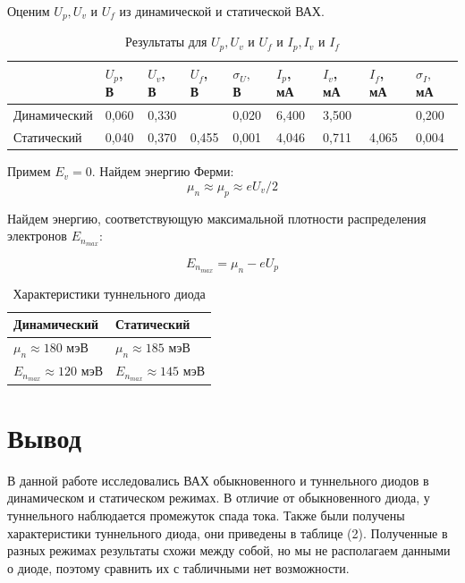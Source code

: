 \documentclass[a4paper,12pt]{article} %
\begin{document}
Оценим $U_p, U_v$ и $U_f$ из динамической и статической ВАХ.

\begin{table}[h!]
\begin{tabular}{|l|l|l|l|l|l|l|l|l|}
\hline
             & $U_p$, В & $U_v$, В & $U_f$, В & $\sigma_U, $ В & $I_p$, мА & $I_v$, мА & $I_f$, мА & $\sigma_I, $ мА \\ \hline
Динамический & 0,060    & 0,330    &          & 0,020          & 6,400     & 3,500     &           & 0,200           \\ \hline
Статический  & 0,040    & 0,370    & 0,455    & 0,001          & 4,046     & 0,711     & 4,065     & 0,004           \\ \hline
\end{tabular}
\caption{Результаты для $U_p, U_v$ и $U_f$ и $I_p, I_v$ и $I_f$}
\end{table}

Примем $E_v = 0$. Найдем энергию Ферми:
$$\mu_n \approx \mu_p \approx eU_v/2$$

Найдем энергию, соответствующую максимальной плотности распределения электронов $E_{n_{max}}$:

$$E_{n_{max}} = \mu_n - eU_p$$


\begin{table}[h!]
\begin{tabular}{|l|l|}
\hline
Динамический                 & Статический                  \\ \hline
$\mu_n \approx 180$ мэВ     & $\mu_n \approx 185$ мэВ     \\ \hline
$E_{n_{max}} \approx 120$ мэВ & $E_{n_{max}} \approx 145$ мэВ \\ \hline
\end{tabular}
\caption{Характеристики туннельного диода}
\end{table}

\section{Вывод}
В данной работе исследовались ВАХ обыкновенного и туннельного диодов в динамическом и статическом режимах. В отличие от обыкновенного диода, у туннельного наблюдается промежуток спада тока. Также были получены характеристики туннельного диода, они приведены в таблице (2). Полученные в разных режимах результаты схожи между собой, но мы не располагаем данными о диоде, поэтому сравнить их с табличными нет возможности.
\end{document}
